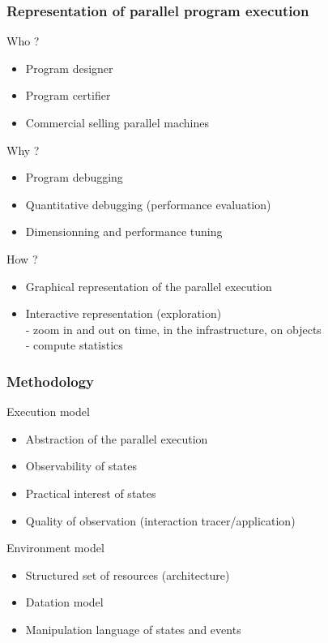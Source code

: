 \begin{frame}
\frametitle{Representation of parallel program execution}
\begin{block}{Who ?}
\begin{itemize}
\item Program designer
\item Program certifier
\item Commercial selling parallel machines
\end{itemize}
\end{block}
\begin{block}{Why ?}
\begin{itemize}
\item Program debugging
\item Quantitative debugging (performance evaluation)
\item Dimensionning and performance tuning
\end{itemize}
\end{block}
\begin{block}{How ? }
\begin{itemize}
\item Graphical representation of the parallel execution
\item Interactive representation (exploration)\\
- zoom in and out on time, in the infrastructure, on objects\\
- compute statistics
\end{itemize}
\end{block}
\end{frame}
\begin{frame}
\frametitle{Methodology}
\begin{block}{Execution model}
\begin{itemize}
\item Abstraction of the parallel execution
\item Observability of states
\item Practical interest of states
\item Quality of observation (interaction tracer/application)
\end{itemize}
\end{block}
\begin{block}{Environment model}
\begin{itemize}
\item Structured set of resources (architecture)
\item Datation model
\item Manipulation language of states and events
\end{itemize}
\end{block}
\end{frame}
